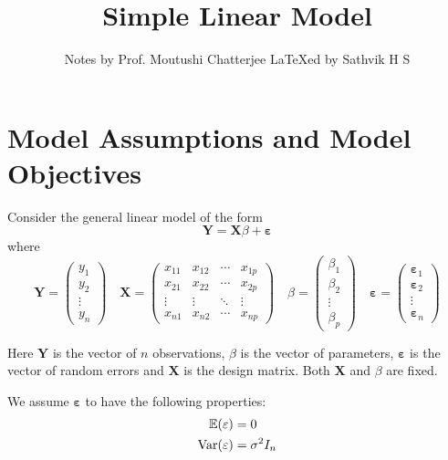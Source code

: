 \documentclass[10pt, a4paper]{article}
\title{Simple Linear Model}
\author{Notes by Prof. Moutushi Chatterjee \LaTeX ed by Sathvik H S}
\date{}
\begin{document}
\maketitle
\tableofcontents
\clearpage
{}
\setcounter{page}{1}

\section{Model Assumptions and Model Objectives}
\begin{definition}
Consider the general linear model of the form 
\begin{equation}
	\mathbf{Y} = \mathbf{X} \beta + \mathbf{\varepsilon} \label{model_eq}
\end{equation}
where 
\[ \mathbf{Y} = 
\begin{pmatrix}
    y_{1} \\ 
    y_{2} \\ 
    \vdots \\ 
    y_{n}
\end{pmatrix}
\quad
\mathbf{X} = 
\begin{pmatrix}
x_{11} & x_{12} & \cdots & x_{1p} \\
x_{21} & x_{22} & \cdots & x_{2p} \\
\vdots & \vdots & \ddots & \vdots \\
x_{n1} & x_{n2} & \cdots & x_{np} 
\end{pmatrix}
\quad
\beta =
\begin{pmatrix}
\beta_{1} \\
\beta_{2} \\
\vdots \\
\beta_{p}
\end{pmatrix}
\quad
\mathbf{\varepsilon} = 
\begin{pmatrix}
    \mathbf{\varepsilon}_{1} \\ 
    \mathbf{\varepsilon}_{2} \\ 
    \vdots \\ 
    \mathbf{\varepsilon}_{n}
\end{pmatrix}
\] 

Here \( \mathbf{Y} \) is the vector of \( n \) observations, \( \beta \) is the vector of parameters, \( \mathbf{\varepsilon} \) is the vector of random errors and \( \mathbf{X} \) is the design matrix.
Both \( \mathbf{X} \) and \( \beta \) are fixed.
\end{definition}

\begin{assumptions}
We assume \( \mathbf{\varepsilon} \) to have the following properties:
\begin{align}
	\mathbb{E}(\mathbf{\varepsilon}) &= 0 \\
	\operatorname{Var}(\mathbf{\varepsilon}) &= \sigma^{2} I_{n}
\end{align}
\end{assumptions}
\end{document}
